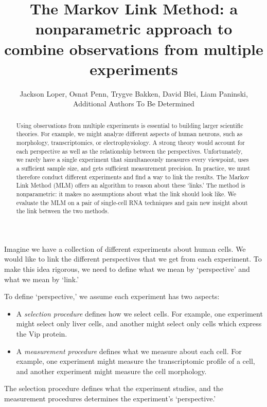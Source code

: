 \usepackage{cancel}


\title{The Markov Link Method: a nonparametric approach to combine observations from multiple experiments}
\author{Jackson Loper, Osnat Penn, Trygve Bakken, David Blei, Liam Paninski, \\Additional Authors To Be Determined}

\usepackage{amsthm}
\newtheorem{thm}{Theorem}
\newtheorem{lem}{Lemma}
\newtheorem{conj}{Conjecture}

\theoremstyle{definition}
\newtheorem{example}{Example}
\newtheorem{definition}{Definition}


\maketitle

\begin{abstract}
Using observations from multiple experiments is essential to building larger scientific theories.  For example, we might analyze different aspects of human neurons, such as morphology, transcriptomics, or electrophysiology.  A strong theory would account for each perspective as well as the relationship between the perspectives.  Unfortunately, we rarely have a single experiment that simultaneously measures every viewpoint, uses a sufficient sample size, and gets sufficient measurement precision.  In practice, we must therefore conduct different experiments and find a way to link the results.  The Markov Link Method (MLM) offers an algorithm to reason about these `links.' The method is nonparametric: it makes no assumptions about what the link should look like.  We evaluate the MLM on a pair of single-cell RNA techniques and gain new insight about the link between the two methods.
\end{abstract}

Imagine we have a collection of different experiments about human cells.  We would like to link the different perspectives that we get from each experiment.  To make this idea rigorous, we need to define what we mean by `perspective' and what we mean by `link.'  

To define `perspective,' we assume each experiment has two aspects:
%
\begin{itemize}
    \item A \emph{selection procedure} defines how we select cells.  For example, one experiment might select only liver cells, and another might select only cells which express the Vip protein.  
    \item A \emph{measurement procedure} defines what we measure about each cell.  For example, one experiment might measure the transcriptomic profile of a cell, and another experiment might measure the cell morphology.
\end{itemize}
%
The selection procedure defines what the experiment studies, and the measurement procedures determines the experiment's `perspective.'

